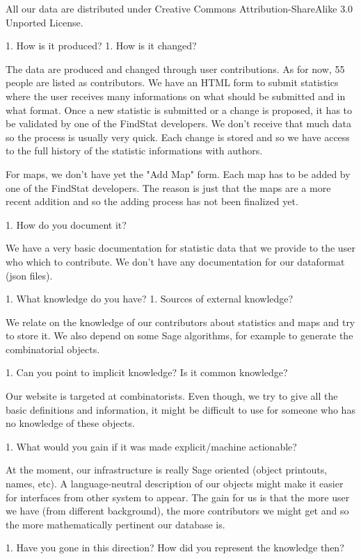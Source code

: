 \documentclass{deliverablereport}
\begin{document}
All our data are distributed under Creative Commons Attribution-ShareAlike 3.0 Unported License.

 1. How is it produced?
 1. How is it changed?

The data are produced and changed through user contributions. As for now, 55 people are listed as contributors. We have an HTML form to submit statistics where
the user receives many informations on what should be submitted and in what format. Once a new statistic is submitted or a change is proposed, it has to be validated
by one of the FindStat developers. We don't receive that much data so the process is usually very quick. Each change is stored and so we have access to the full history
of the statistic informations with authors.

For maps, we don't have yet the "Add Map" form. Each map has to be added by one of the FindStat developers. The reason is just that the maps are a more recent addition and
so the adding process has not been finalized yet.

 1. How do you document it?

We have a very basic documentation for statistic data that we provide to the user who which to contribute. We don't have any documentation for our dataformat (json files).

1. What knowledge do you have?
 1. Sources of external knowledge?

We relate on the knowledge of our contributors about statistics and maps and try to store it. We also depend on some Sage algorithms, for example to generate the combinatorial
objects.

 1. Can you point to implicit knowledge? Is it common knowledge?

Our website is targeted at combinatorists. Even though, we try to give all the basic definitions and information, it might be difficult to use for someone who has no
knowledge of these objects.

 1. What would you gain if it was made explicit/machine actionable?

At the moment, our infrastructure is really Sage oriented (object printouts, names, etc). A language-neutral description of our objects might make it easier for interfaces
from other system to appear. The gain for us is that the more user we have (from different background), the more contributors we might get and so the more mathematically
pertinent our database is.

 1. Have you gone in this direction? How did you represent the knowledge then?
\end{document}
